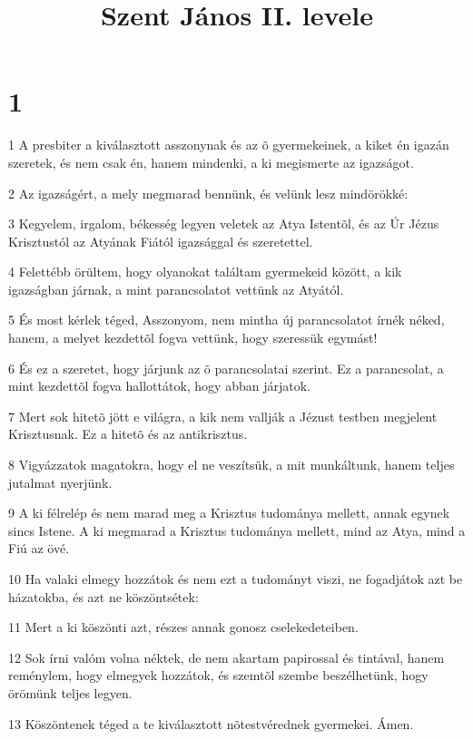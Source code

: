 

\title{Szent János II. levele}


\chapter{1}

\par 1 A presbiter a kiválasztott asszonynak és az õ gyermekeinek, a kiket én igazán szeretek, és nem csak én, hanem mindenki, a ki megismerte az igazságot.
\par 2 Az igazságért, a mely megmarad bennünk, és velünk lesz mindörökké:
\par 3 Kegyelem, irgalom, békesség legyen veletek az Atya Istentõl, és az Úr Jézus Krisztustól az Atyának Fiától igazsággal és szeretettel.
\par 4 Felettébb örültem, hogy olyanokat találtam gyermekeid között, a kik igazságban járnak, a mint parancsolatot vettünk az Atyától.
\par 5 És most kérlek téged, Asszonyom, nem mintha új parancsolatot írnék néked, hanem, a melyet kezdettõl fogva vettünk, hogy szeressük egymást!
\par 6 És ez a szeretet, hogy járjunk az õ parancsolatai szerint. Ez a parancsolat, a mint kezdettõl fogva hallottátok, hogy abban járjatok.
\par 7 Mert sok hitetõ jött e világra, a kik nem vallják a Jézust testben megjelent Krisztusnak. Ez a hitetõ és az antikrisztus.
\par 8 Vigyázzatok magatokra, hogy el ne veszítsük, a mit munkáltunk, hanem teljes jutalmat nyerjünk.
\par 9 A ki félrelép és nem marad meg a Krisztus tudománya mellett, annak egynek sincs Istene. A ki megmarad a Krisztus tudománya mellett, mind az Atya, mind a Fiú az övé.
\par 10 Ha valaki elmegy hozzátok és nem ezt a tudományt viszi, ne fogadjátok azt be házatokba, és azt ne köszöntsétek:
\par 11 Mert a ki köszönti azt, részes annak gonosz cselekedeteiben.
\par 12 Sok írni valóm volna néktek, de nem akartam papirossal és tintával, hanem reménylem, hogy elmegyek hozzátok, és szemtõl szembe beszélhetünk, hogy örömünk  teljes legyen.
\par 13 Köszöntenek téged a te kiválasztott nõtestvérednek gyermekei. Ámen.


